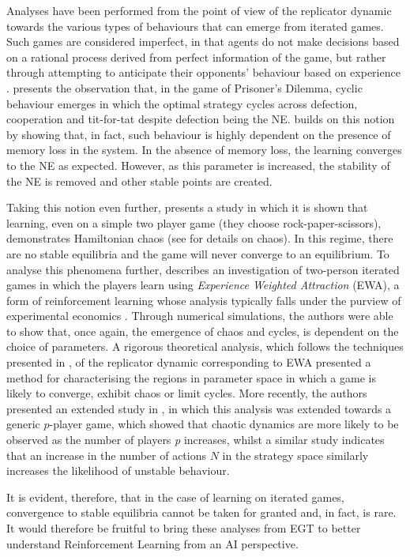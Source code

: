 \documentclass[sigconf]{aamas}
\begin{document}
Analyses have been performed from the point of view of the replicator dynamic towards the various types of behaviours that can emerge from iterated games. Such games are considered imperfect, in that agents do not make decisions based on a rational process derived from perfect information of the game, but rather through attempting to anticipate their opponents' behaviour based on experience \cite{Galla2011}. \cite{Imhof2005} presents the observation that, in the game of Prisoner's Dilemma, cyclic behaviour emerges in which the optimal strategy cycles across defection, cooperation and tit-for-tat despite defection being the NE. \cite{Galla2011} builds on this notion by showing that, in fact, such behaviour is highly dependent on the presence of memory loss in the system. In the absence of memory loss, the learning converges to the NE as expected. However, as this parameter is increased, the stability of the NE is removed and other stable points are created. 

Taking this notion even further, \cite{Sato2002} presents a study in which it is shown that learning, even on a simple two player game (they choose rock-paper-scissors), demonstrates Hamiltonian chaos (see \cite{Strogatz2000} for details on chaos). In this regime, there are no stable equilibria and the game will never converge to an equilibrium. To analyse this phenomena further, \cite{Galla2013} describes an investigation of two-person iterated games in which the players learn using \textit{Experience Weighted Attraction} (EWA), a form of reinforcement learning whose analysis typically falls under the purview of experimental economics \cite{Camerer2009}. Through numerical simulations, the authors were able to show that, once again, the emergence of chaos and cycles, is dependent on the choice of parameters. A rigorous theoretical analysis, which follows the techniques presented in \cite{Opper1992}, of the replicator dynamic corresponding to EWA presented a method for characterising the regions in parameter space in which a game is likely to converge, exhibit chaos or limit cycles. More recently, the authors presented an extended study in \cite{Sanders2018}, in which this analysis was extended towards a generic $p$-player game, which showed that chaotic dynamics are more likely to be observed as the number of players \textit{p} increases, whilst a similar study \cite{Pangallo2019} indicates that an increase in the number of actions $N$ in the strategy space similarly increases the likelihood of unstable behaviour. 

It is evident, therefore, that in the case of learning on iterated games, convergence to stable equilibria cannot be taken for granted and, in fact, is rare. It would therefore be fruitful to bring these analyses from EGT to better understand Reinforcement Learning from an AI perspective.
\end{document}
